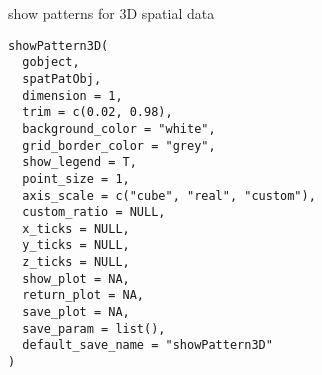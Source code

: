 \documentclass[a4paper]{book}
\begin{document}
%
\begin{Description}\relax
show patterns for 3D spatial data
\end{Description}
%
\begin{Usage}
\begin{verbatim}
showPattern3D(
  gobject,
  spatPatObj,
  dimension = 1,
  trim = c(0.02, 0.98),
  background_color = "white",
  grid_border_color = "grey",
  show_legend = T,
  point_size = 1,
  axis_scale = c("cube", "real", "custom"),
  custom_ratio = NULL,
  x_ticks = NULL,
  y_ticks = NULL,
  z_ticks = NULL,
  show_plot = NA,
  return_plot = NA,
  save_plot = NA,
  save_param = list(),
  default_save_name = "showPattern3D"
)
\end{verbatim}
\end{Usage}
%
\end{document}
